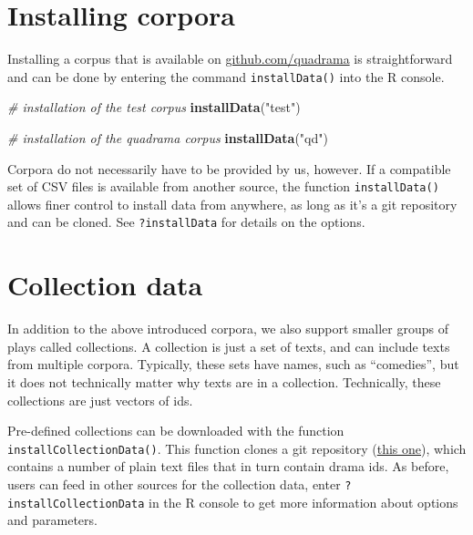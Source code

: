 \documentclass[]{book}
\newenvironment{Shaded}{\begin{snugshade}}{\end{snugshade}}
\newcommand{\CommentTok}[1]{\textcolor[rgb]{0.56,0.35,0.01}{\textit{#1}}}
\newcommand{\KeywordTok}[1]{\textcolor[rgb]{0.13,0.29,0.53}{\textbf{#1}}}
\newcommand{\NormalTok}[1]{#1}
\newcommand{\StringTok}[1]{\textcolor[rgb]{0.31,0.60,0.02}{#1}}
\begin{document}
\hypertarget{installing-corpora}{%
\section{Installing corpora}\label{installing-corpora}}

Installing a corpus that is available on \href{http://github.com/quadrama}{github.com/quadrama} is straightforward and can be done by entering the command \texttt{installData()} into the R console.

\begin{Shaded}
\begin{Highlighting}[]
\CommentTok{# installation of the test corpus}
\KeywordTok{installData}\NormalTok{(}\StringTok{"test"}\NormalTok{)}

\CommentTok{# installation of the quadrama corpus}
\KeywordTok{installData}\NormalTok{(}\StringTok{"qd"}\NormalTok{)}
\end{Highlighting}
\end{Shaded}

Corpora do not necessarily have to be provided by us, however. If a compatible set of CSV files is available from another source, the function \texttt{installData()} allows finer control to install data from anywhere, as long as it's a git repository and can be cloned. See \texttt{?installData} for details on the options.

\hypertarget{collection-data}{%
\section{Collection data}\label{collection-data}}

In addition to the above introduced corpora, we also support smaller groups of plays called collections. A collection is just a set of texts, and can include texts from multiple corpora. Typically, these sets have names, such as ``comedies'', but it does not technically matter why texts are in a collection. Technically, these collections are just vectors of ids.

Pre-defined collections can be downloaded with the function \texttt{installCollectionData()}. This function clones a git repository (\href{https://github.com/quadrama/metadata}{this one}), which contains a number of plain text files that in turn contain drama ids. As before, users can feed in other sources for the collection data, enter \texttt{?installCollectionData} in the R console to get more information about options and parameters.
\end{document}
